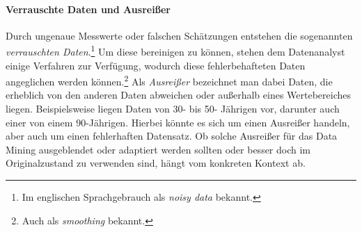 \paragraph{Verrauschte Daten und Ausreißer}
\label{outlierchapter}
Durch ungenaue Messwerte oder falschen Schätzungen entstehen die sogenannten \textit{verrauschten Daten}.\footnote{Im englischen Sprachgebrauch als \textit{noisy data} bekannt.} Um diese bereinigen zu können, stehen dem Datenanalyst einige Verfahren zur Verfügung, wodurch diese fehlerbehafteten Daten angeglichen werden können.\footnote{Auch als \textit{smoothing} bekannt.} Als \textit{Ausreißer} bezeichnet man dabei Daten, die erheblich von den anderen Daten abweichen oder außerhalb eines Wertebereiches liegen. Beispielsweise liegen Daten von 30- bis 50- Jährigen vor, darunter auch einer von einem 90-Jährigen. Hierbei könnte es sich um einen Ausreißer handeln, aber auch um einen fehlerhaften Datensatz. \glqq Ob solche Ausreißer für das Data Mining ausgeblendet oder adaptiert werden sollten oder besser doch im Originalzustand zu verwenden sind, hängt vom konkreten Kontext ab.\grqq{}


